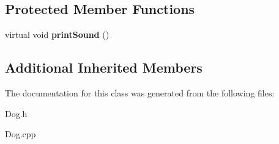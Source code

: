 \subsection*{Protected Member Functions}
\begin{DoxyCompactItemize}
\item 
\mbox{\label{class_dog_a042e0f6390025ea229fdba51a60c2ca7}} 
virtual void {\bfseries print\+Sound} ()
\end{DoxyCompactItemize}
\subsection*{Additional Inherited Members}


The documentation for this class was generated from the following files\+:\begin{DoxyCompactItemize}
\item 
Dog.\+h\item 
Dog.\+cpp\end{DoxyCompactItemize}
